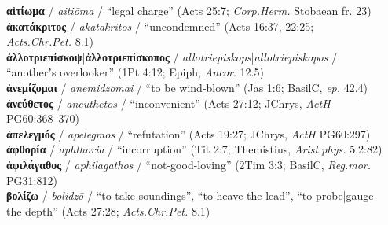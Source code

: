 \begin{small} %
\noindent{}\textbf{αἰτίωμα} / \textit{aitiōma} / “legal charge” (Acts 25:7; \textit{Corp.Herm.} Stobaean fr. 23) \\[0.4mm] %
\noindent{}\textbf{ἀκατάκριτος} / \textit{akatakritos} / “uncondemned” (Acts 16:37, 22:25; \\ %
 \makebox[3em][l]{} \textit{Acts.Chr.Pet.} 8.1)%
 \\[0.4mm] %
\noindent{}\textbf{ἀλλοτριεπίσκοψ}|\textbf{ἀλλοτριεπίσκοπος} / \textit{allotriepiskops}|\textit{allotriepiskopos} / \\ %
 \makebox[3em][l]{} “anotherʼs overlooker” (1Pt 4:12; Epiph, \textit{Ancor}. 12.5) \\[0.4mm] %
\noindent{}\textbf{ἀνεμίζομαι} / \textit{anemidzomai} / “to be wind-blown” (Jas 1:6; BasilC, \textit{ep.} 42.4) \\[0.4mm] %
\noindent{}\textbf{ἀνεύθετος} / \textit{aneuthetos} / “inconvenient” (Acts 27:12; JChrys, \textit{ActH} \\\makebox[3em][l]{}PG60:368--370) \\[0.4mm] %
\noindent{}\textbf{ἀπελεγμός} / \textit{apelegmos} / “refutation” (Acts 19:27; JChrys, \textit{ActH} PG60:297) \\[0.4mm] %
\noindent{}\textbf{ἀφθορία} / \textit{aphthoria} / “incorruption” (Tit 2:7; Themistius, \textit{Arist.phys.} 5.2:82) \\[0.4mm] %
\noindent{}\textbf{ἀφιλάγαθος} / \textit{aphilagathos} / “not-good-loving” (2Tim 3:3; BasilC, \textit{Reg.mor.} \\\makebox[3em][l]{}PG31:812) \\[1mm] %
\noindent{}\textbf{βολίζω} / \textit{bolidzō} / “to take soundings”, “to heave the lead”, %
“to probe|gauge \\\makebox[3em][l]{}the depth” (Acts 27:28; \textit{Acts.Chr.Pet.} 8.1)
\end{small}
